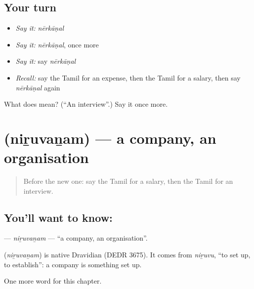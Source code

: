 \subsection*{Your turn}
\begin{itemize}
\raggedright
  \item \emph{Say it:} \emph{nērkāṇal}
  \item \emph{Say it:} \emph{nērkāṇal}, once more
  \item \emph{Say it:} say \emph{nērkāṇal}
  \item \emph{Recall:} say the Tamil for an expense, then the Tamil for a salary, then say \emph{nērkāṇal} again
\end{itemize}

\begin{tcolorbox}[breakable,colback=teal!4,colframe=teal!35!black,title={Before you move on}]
What does  mean? (\textquotedblleft{}An interview\textquotedblright{}.) Say it once more.
\end{tcolorbox}
\section[\texorpdfstring{\ta{நிறுவனம்} (niṟuvaṉam)}{நிறுவனம் (niṟuvaṉam)}]{ (niṟuvaṉam) — a company, an organisation}

\label{lesson:TA-C223-niruvanam}



\begin{quote}
Before the new one: say the Tamil for a salary, then the Tamil for an interview.
\end{quote}

\subsection*{You'll want to know: }
\textbf{} — \emph{niṟuvaṉam} — \textquotedblleft{}a company, an organisation\textquotedblright{}.

\begin{cousinweb}
\textbf{} (\emph{niṟuvaṉam}) is native Dravidian (DEDR 3675). It comes from \emph{niṟuvu}, \textquotedblleft{}to set up, to establish\textquotedblright{}: a company is something set up.
\end{cousinweb}

\begin{grammarlens}[title={What you've built}]
One more word for this chapter.
\end{grammarlens}

